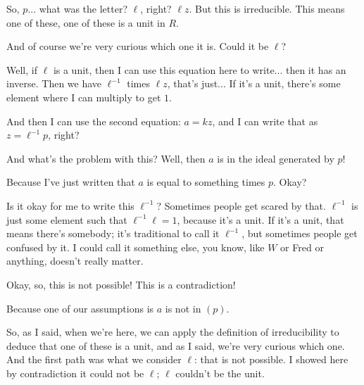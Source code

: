 \begin{proofWrapper}
\begin{speech}[00:50:50 - 00:52:42]
So, $p$... what was the letter? $\ell$, right? $\ell z$.  But this is irreducible. This means one of these,  one of these is a unit in $R$.

And of course we're very curious which one it is. Could it be $\ell$? 

Well, if $\ell$ is a unit,  then I can use this equation here to write... then it has an inverse. Then we have $\ell^{-1}$ times $\ell z$, that's just...  If it's a unit, there's some element where I can multiply to get $1$.

And then I can use the second equation: $a = kz$, and I can write that as $z = \ell^{-1} p$, right? 

And what's the problem with this? Well, then $a$ is in the ideal generated by $p$! 

Because I've just written that $a$ is equal to something times $p$.  Okay?
\end{speech}

\begin{speech}[00:52:42 - 00:54:02]
Is it okay for me to write this $\ell^{-1}$? Sometimes people get scared by that. $\ell^{-1}$ is just some element such that  $\ell^{-1} \ell = 1$, because it's a unit. If it's a unit, that means there's somebody; it's traditional to call it $\ell^{-1}$, but sometimes people get confused by it. I could call it something else, you know, like $W$ or Fred or anything, doesn't really matter.

Okay, so, this is not possible! This is a contradiction! 

Because one of our assumptions is $a$ is not in $(p)$. 

So, as I said, when we're here, we can apply the definition of irreducibility to deduce that one of these is a unit, and as I said, we're very curious which one. And the first path was what we consider $\ell$: that is not possible. I showed here by contradiction it could not be $\ell$; $\ell$ couldn't be the unit.
\end{speech}


\end{proofWrapper}
